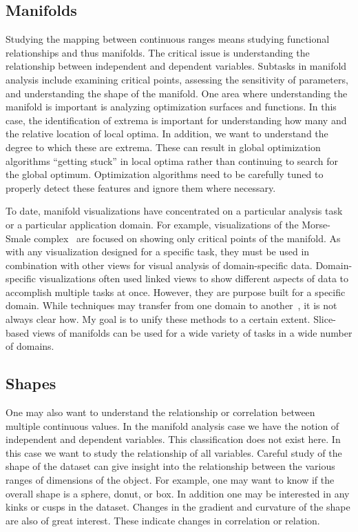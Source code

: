 \subsection{Manifolds}
\label{sec:manifolds}

Studying the mapping between continuous ranges means studying functional
relationships and thus manifolds.  The critical issue is understanding the
relationship between independent and dependent variables.  Subtasks in manifold
analysis include examining critical points, assessing the sensitivity of
parameters, and understanding the shape of the manifold.  
One area where
understanding the manifold is important is analyzing optimization surfaces and
functions.  In this case, the identification of extrema is important for
understanding how many and the relative location of local optima. In addition,
we want to understand the degree to which these are extrema. These can result
in global optimization algorithms ``getting stuck'' in local optima rather than
continuing to search for the global optimum. Optimization algorithms need to be
carefully tuned to properly detect these features and ignore them where
necessary.

To date, manifold visualizations have concentrated on a particular analysis
task or a particular application domain. For example, visualizations of the
Morse-Smale complex~\cite{Gerber:2010} are focused on showing only critical
points of the manifold. As with any visualization designed for a specific task,
they must be used in combination with other views for visual analysis of
domain-specific data. Domain-specific visualizations often used linked views to
show different aspects of data to accomplish multiple tasks at once. However,
they are purpose built for a specific domain. While techniques may transfer
from one domain to another~\cite{Sedlmair:2012}, it is not always clear how.
My goal is to unify these methods to a certain extent.  
Slice-based views of manifolds can be used for a
wide variety of tasks in a wide number of domains.

\subsection{Shapes}
\label{sec:shapes}

One may also want to understand the relationship or correlation between
multiple continuous values. In the manifold analysis case we have the notion
of independent and dependent variables. This classification does not exist 
here.
In this case
we want to study the relationship of all variables. Careful study of the shape
of the dataset can give insight into the relationship between the various
ranges of dimensions of the object. For example, one may want to know if the
overall shape is a sphere, donut, or box. In addition one may be interested in
any kinks or cusps in the dataset. Changes in the gradient and curvature of
the shape are also of great interest. These indicate changes in correlation or
relation.

